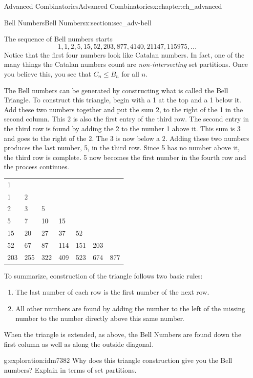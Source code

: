 \documentclass[oneside,10pt,]{book}
\numberwithin{equation}{chapter}
\begin{document}
\begin{chapterptx}{Advanced Combinatorics}{}{Advanced Combinatorics}{}{}{x:chapter:ch_advanced}
\begin{sectionptx}{Bell Numbers}{}{Bell Numbers}{}{}{x:section:sec_adv-bell}
\par
The sequence of Bell numbers starts%
\begin{equation*}
1, 1, 2, 5, 15, 52, 203, 877, 4140, 21147, 115975, \ldots
\end{equation*}
Notice that the first four numbers look like Catalan numbers.  In fact, one of the many things the Catalan numbers count are \emph{non-intersecting} set partitions.  Once you believe this, you see that \(C_n \le B_n\) for all \(n\).%
\par
The Bell numbers can be generated by constructing what is called the Bell Triangle. To construct this triangle, begin with a 1 at the top and a 1 below it. Add these two numbers together and put the sum 2, to the right of the 1 in the second column. This 2 is also the first entry of the third row. The second entry in the third row is found by adding the 2 to the number 1 above it. This sum is 3 and goes to the right of the 2. The 3 is now below a 2. Adding these two numbers produces the last number, 5, in the third row. Since 5 has no number above it, the third row is complete. 5 now becomes the first number in the fourth row and the process continues.%
\begin{sidebyside}{1}{0.15}{0.15}{0}%
\begin{sbspanel}{0.7}%
{\centering%
\begin{tabular}{lllllll}
1&&&&&&\tabularnewline[0pt]
1&2&&&&&\tabularnewline[0pt]
2&3&5&&&&\tabularnewline[0pt]
5&7&10&15&&&\tabularnewline[0pt]
15&20&27&37&52&&\tabularnewline[0pt]
52&67&87&114&151&203&\tabularnewline[0pt]
203&255&322&409&523&674&877
\end{tabular}
\par}
\end{sbspanel}%
\end{sidebyside}%
\par
To summarize, construction of the triangle follows two basic rules:%
\begin{enumerate}
\item{}The last number of each row is the first number of the next row.%
\item{}All other numbers are found by adding the number to the left of the missing number to the number directly above this same number.%
\end{enumerate}
When the triangle is extended, as above, the Bell Numbers are found down the first column as well as along the outside diagonal.%
\begin{exploration}{}{g:exploration:idm7382}%
Why does this triangle construction give you the Bell numbers?  Explain in terms of set partitions.%

\end{exploration}
\end{sectionptx}
\end{chapterptx}
\end{document}
